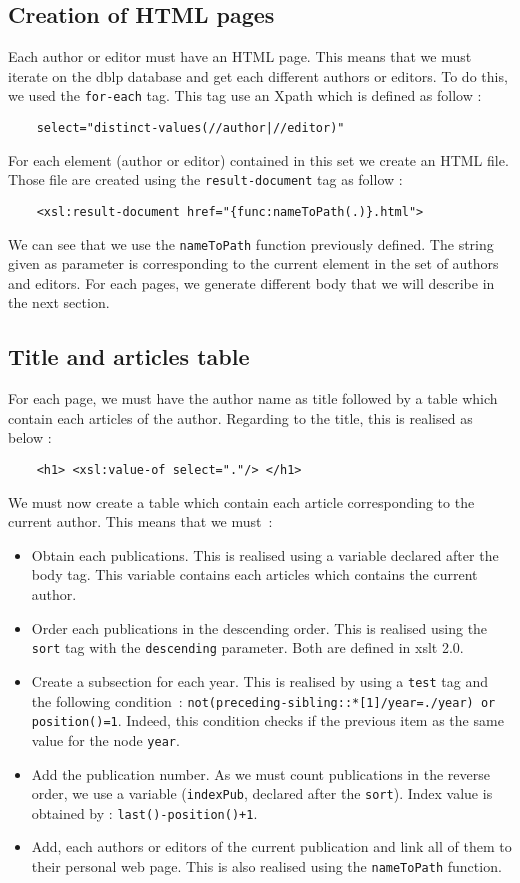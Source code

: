 \documentclass{article}
\begin{document}
\subsection{Creation of HTML pages} 
Each author or editor must have an HTML page. This means that we must iterate on the dblp database and get each different authors or editors. To do this, we used the \verb|for-each| tag. This tag use an Xpath which is defined as follow : 
\begin{verbatim}
    select="distinct-values(//author|//editor)"
\end{verbatim}
For each element (author or editor) contained in this set we create an HTML file. Those file are created using the \verb|result-document| tag as follow :
\begin{verbatim}
    <xsl:result-document href="{func:nameToPath(.)}.html">
\end{verbatim}
We can see that we use the \verb|nameToPath| function previously defined. The string given as parameter is corresponding to the current element in the set of authors and editors. For each pages, we generate different body that we will describe in the next section.

\subsection{Title and articles table}
For each page, we must have the author name as title followed by a table which contain each articles of the author. Regarding to the title, this is realised as below : 
\begin{verbatim}
    <h1> <xsl:value-of select="."/> </h1>
\end{verbatim}
We must now create a table which contain each article corresponding to the current author. This means that we must~:
\begin{itemize}
\item Obtain each publications. This is realised using a variable declared after the body tag. This variable contains each articles which contains the current author.
\item Order each publications in the descending order. This is realised using the \verb|sort| tag with the \verb|descending| parameter. Both are defined in xslt 2.0.
\item Create a subsection for each year. This is realised by using a \verb|test| tag and the following condition~: \verb|not(preceding-sibling::*[1]/year=./year) or position()=1|. Indeed, this condition checks if the previous item as the same value for the node \verb|year|.
\item Add the publication number. As we must count publications in the reverse order, we use a variable (\verb|indexPub|, declared after the \verb|sort|). Index value is obtained by : \verb|last()-position()+1|.
\item Add, each authors or editors of the current publication and link all of them to their personal web page. This is also realised using the \verb|nameToPath| function.
\end{itemize}
\end{document}
